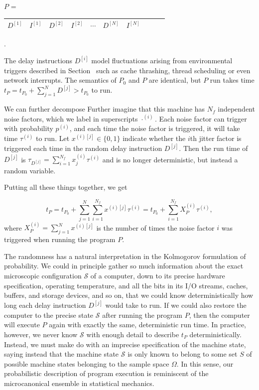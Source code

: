 \documentclass[conference]{IEEEtran}
\begin{document}
$P$ = \begin{tabular}{|c|c|c|c|c|c|c|c|c|c|}
\hline
$D^{[1]}$ & $I^{[1]}$ & $D^{[2]}$ & $I^{[2]}$ &
$\cdots$ & $D^{[N]}$ & $I^{[N]}$
\tabularnewline
\hline
\end{tabular}.

The delay instructions $D^{[i]}$ model fluctuations arising from environmental
triggers described in Section~\label{ref:intro} such as cache thrashing, thread
scheduling or even network interrupts. The semantics of $P_0$ and $P$ are
identical, but $P$ run takes time $t_P = t_{P_0} + \sum_{j=1}^N D^{[j]} > t_{P_0}$
to run.

We can further decompose
Further imagine that this machine has $N_f$ independent noise factors, which we label in superscripts $\cdot^{(i)}$. Each noise factor can trigger with probability $p^{(i)}$, and each time the noise factor is triggered, it will take time $\tau^{(i)}$ to run. Let $x^{(i)[j]} \in \{0, 1\}$ indicate whether the $i$th jitter factor is triggered each time in the random delay instruction $D^{[j]}$. Then the run time of $D^{[j]}$ is
$\tau_{D^{[j]}} = \sum_{i=1}^{N_f} x^{(i)}_j \tau^{(i)}$ and is no longer deterministic, but instead a random variable.

Putting all these things together, we get

\begin{equation}
t_P = t_{P_0} + \sum_{j=1}^N \sum_{i=1}^{N_f} x^{(i)[j]} \tau^{(i)}
= t_{P_0} + \sum_{i=1}^{N_f} X_P^{(i)} \tau^{(i)},
\end{equation}
%
where $X_P^{(i)} = \sum_{j=1}^N x^{(i)[j]}$ is the number of times the noise factor $i$ was triggered when running the program $P$.

The randomness has a natural interpretation in the Kolmogorov formulation of probability. We could in principle gather so much information about the exact microscopic configuration $\mathcal S$ of a computer, down to its precise hardware specification, operating temperature, and all the bits in its I/O streams, caches, buffers, and storage devices, and so on, that we could know deterministically how long each delay instruction $D^{[j]}$ would take to run. If we could also restore the computer to the precise state $\mathcal S$ after running the program $P$, then the computer will execute $P$ again with exactly the same, deterministic run time. In practice, however, we never know $\mathcal S$ with enough detail to describe $t_P$ deterministically. Instead, we must make do with an imprecise specification of the machine state, saying instead that the machine state $\mathcal S$ is only known to belong to some set $S$ of possible machine states belonging to the sample space $\Omega$. In this sense, our probabilistic description of program execution is reminiscent of the microcanonical ensemble in statistical mechanics.
\end{document}
